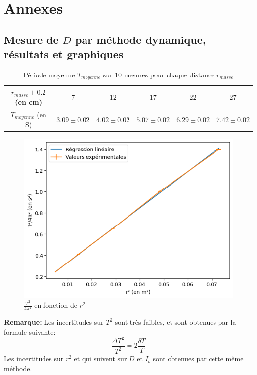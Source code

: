 \documentclass[11pt]{article}
\begin{document}
\break
\section{Annexes}
\subsection{Mesure de $D$ par méthode dynamique, résultats et graphiques}
\label{section:D_dynamique}
\begin{table}[h!]
	\centering
	\begin{tabular}{||c | c c c c c||} 
		\hline
		$r_{masse} \pm 0.2$ (en cm) & $7$ & $12$ & $17$ & $22$ & $27$ \\
		\hline
        $T_{moyenne}$ (en S) & $3.09 \pm 0.02$ & $4.02 \pm 0.02$ & $5.07 \pm 0.02$ & $6.29 \pm 0.02$ & $7.42 \pm 0.02$\\
        \hline
    \end{tabular}
	\caption{Période moyenne $T_{moyenne}$ sur 10 mesures pour chaque distance $r_{masse}$}
	\label{table:mesure_D_dynamique}
\end{table}
\begin{figure}[h!]
    \begin{center}
        \includegraphics*[scale=1]{img/D_dynamique.png}
    \end{center}
    \caption{$\frac{T^2}{4\pi^2}$ en fonction de $r^2$}
    \label{fig:graphe_T}
\end{figure}

\textbf{Remarque:} Les incertitudes sur $T^2$ sont très faibles, et sont obtenues par la formule suivante:
\begin{equation}
    \frac{\Delta T^2}{T^2} = 2 \frac{\delta T}{T}
\end{equation}
Les incertitudes sur $r^2$ et qui suivent sur $D$ et $I_b$ sont obtenues par cette même méthode.
\end{document}
